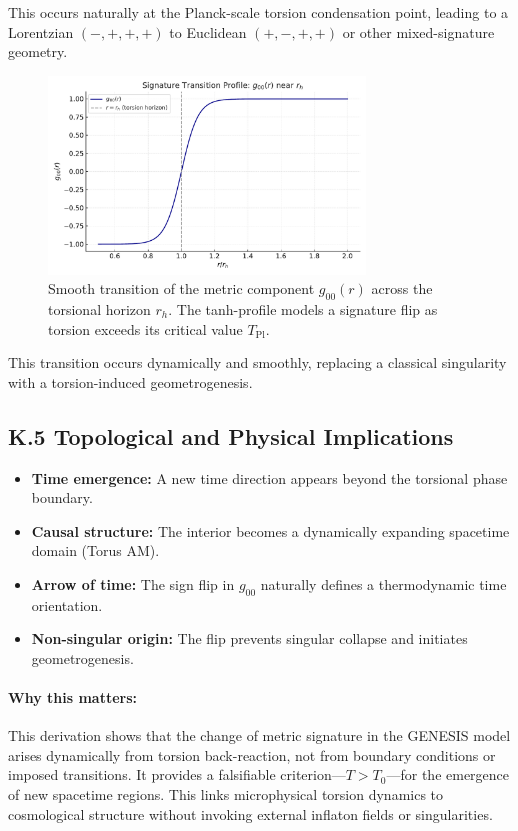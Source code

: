 \documentclass{article}
\begin{document}
This occurs naturally at the Planck-scale torsion condensation point, leading to a Lorentzian $(-,+,+,+)$ to Euclidean $(+,-,+,+)$ or other mixed-signature geometry.

\begin{figure}[h!]
\centering
\includegraphics[width=0.75\textwidth]{Fig_signature_flip.pdf}
\caption{Smooth transition of the metric component $g_{00}(r)$ across the torsional horizon $r_h$.
The tanh-profile models a signature flip as torsion exceeds its critical value $T_{\mathrm{Pl}}$.}
\label{fig:g00_flip}
\end{figure}


\noindent This transition occurs dynamically and smoothly, replacing a classical singularity with a torsion-induced geometrogenesis.


\subsection*{K.5 Topological and Physical Implications}
\begin{itemize}
  \item \textbf{Time emergence:} A new time direction appears beyond the torsional phase boundary.
  \item \textbf{Causal structure:} The interior becomes a dynamically expanding spacetime domain (Torus AM).
  \item \textbf{Arrow of time:} The sign flip in $g_{00}$ naturally defines a thermodynamic time orientation.
  \item \textbf{Non-singular origin:} The flip prevents singular collapse and initiates geometrogenesis.
\end{itemize}

\paragraph{Why this matters:}
This derivation shows that the change of metric signature in the GENESIS model arises dynamically from torsion back-reaction, not from boundary conditions or imposed transitions. It provides a falsifiable criterion—$T > T_0$—for the emergence of new spacetime regions. This links microphysical torsion dynamics to cosmological structure without invoking external inflaton fields or singularities.
\end{document}
